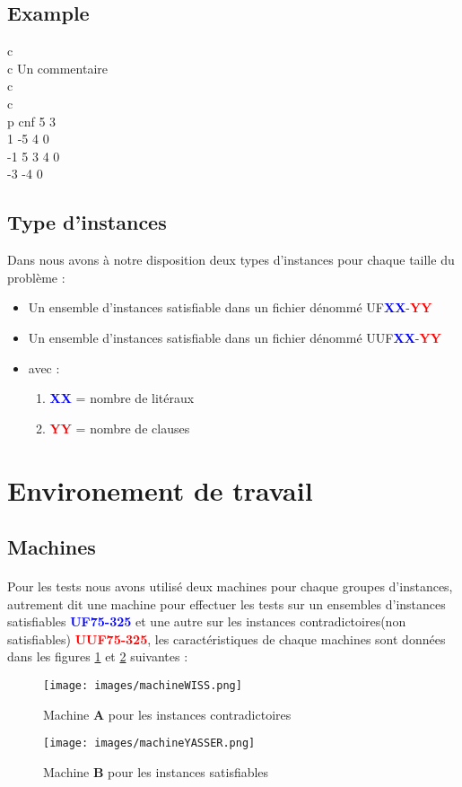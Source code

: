 \subsection{Example}
c\\
c Un commentaire\\
c\\
c \\
p cnf 5 3\\
1 -5 4 0\\
-1 5 3 4 0\\
-3 -4 0\\
\subsection{Type d'instances}
Dans \cite{Benchmark} nous avons à notre disposition deux types d'instances pour chaque taille du problème : \\
\begin{itemize}
	\item Un ensemble d'instances satisfiable dans un fichier dénommé UF\textbf{\textcolor{blue}{XX}}-\textbf{\textcolor{red}{YY}}
	\item Un ensemble d'instances satisfiable dans un fichier dénommé UUF\textbf{\textcolor{blue}{XX}}-\textbf{\textcolor{red}{YY}}
	\item avec : 
	\begin{enumerate}
		\item \textbf{\textcolor{blue}{XX}} = nombre de litéraux
		\item \textbf{\textcolor{red}{YY}} = nombre de clauses
	\end{enumerate}
\end{itemize}
\newpage
\section{Environement de travail}
\subsection{Machines}\label{machines}
\paragraph{}
Pour les tests nous avons utilisé deux machines pour chaque groupes d'instances, autrement dit une machine pour effectuer les tests sur un ensembles d'instances satisfiables \textbf{\textcolor{blue}{UF75-325}}\cite{Benchmark} et une autre sur les instances contradictoires(non satisfiables) \textbf{\textcolor{red}{UUF75-325}}\cite{Benchmark}, les caractéristiques de chaque machines sont données dans les figures \ref{fig:machineA} et \ref{fig:machineB} suivantes : 
\begin{figure}[H]
	\centering
	\texttt{[image: images/machineWISS.png]}
	\caption{Machine \textbf{A} pour les instances contradictoires}
	\label{fig:machineA}
\end{figure}
\begin{figure}[H]
	\centering
	\texttt{[image: images/machineYASSER.png]}
	\caption{Machine \textbf{B} pour les instances satisfiables}
	\label{fig:machineB}
\end{figure}
\newpage
